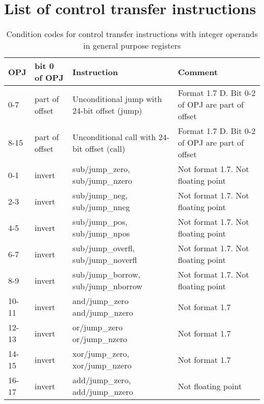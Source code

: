 \documentclass[forwardcom.tex]{subfiles}
\begin{document}
\section{List of control transfer instructions}

\begin{longtable}
{|p{12mm}|p{16mm}|p{60mm}|p{55mm}|}
\caption{Condition codes for control transfer instructions with integer operands in general purpose registers }
\label{table:controlTransferInstructions}
\endfirsthead
\endhead
\hline
\bfseries OPJ & \bfseries bit 0 \newline of OPJ & \bfseries Instruction & \bfseries Comment \\
\hline
0-7 & part of offset & Unconditional jump with 24-bit offset (jump) & Format 1.7 D. Bit 0-2 of OPJ are part of offset \\
\hline
8-15 & part of offset & Unconditional call with 24-bit offset (call) & Format 1.7 D.  Bit 0-2 of OPJ are part of offset \\
\hline
0-1 & invert & sub/jump\_zero, \newline sub/jump\_nzero & Not format 1.7. Not floating point \\
\hline
2-3 & invert & sub/jump\_neg, \newline sub/jump\_nneg & Not format 1.7. Not floating point  \\
\hline
4-5 & invert & sub/jump\_pos, \newline sub/jump\_npos & Not format 1.7. Not floating point \\
\hline
6-7 & invert & sub/jump\_overfl, \newline sub/jump\_noverfl & Not format 1.7. Not floating point \\
\hline
8-9 & invert & sub/jump\_borrow, \newline sub/jump\_nborrow & Not format 1.7. Not floating point \\
\hline
10-11 & invert & and/jump\_zero \newline and/jump\_nzero & Not format 1.7 \\
\hline
12-13 & invert & or/jump\_zero \newline or/jump\_nzero & Not format 1.7 \\
\hline
14-15 & invert & xor/jump\_zero, \newline xor/jump\_nzero & Not format 1.7 \\
\hline
16-17 & invert & add/jump\_zero, \newline add/jump\_nzero & Not floating point \\

\end{longtable}
\end{document}

